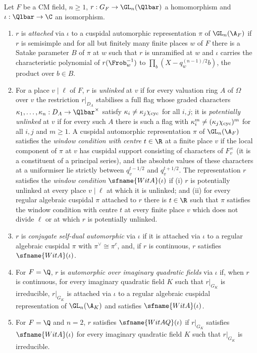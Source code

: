 \begin{definition}[Automorphy]\label{pf:modularity:aut}
Let $F$ be a CM field, $n\ge1$, $r:G_F\to\GL_n(\Qlbar)$ a homomorphism and $\iota:\Qlbar\to\C$ an isomorphism.
\begin{enumerate}[label=(\alph*)]
\item $r$ is \emph{attached} via $\iota$ to a cuspidal automorphic representation $\pi$ of $\GL_n(\A_F)$ if $r$ is
semisimple and for all but finitely many finite places $w$ of $F$ there is a Satake parameter $B$ of $\pi$ at $w$ such
that $r$ is unramified at $w$ and $\iota$ carries the characteristic polynomial of $r(\Frob_w^{-1})$ to
$\prod_{b}(X-q_w^{(n-1)/2}b)$, the product over $b\in B$.
\item For a place $v\mid\ell$ of $F$, $r$ is \emph{unlinked} at $v$ if for every valuation ring $A$ of $\Omega$ over $v$
the restriction $r|_{D_A}$ stabilises a full flag whose graded characters $\kappa_1,\dots,\kappa_n:D_A\to\Qlbar^\times$
satisfy $\kappa_i\ne\kappa_j\chi_{\mathrm{cyc}}$ for all $i,j$; it is \emph{potentially unlinked} at $v$ if for every such
$A$ there is such a flag with $\kappa_i^m\ne(\kappa_j\chi_{\mathrm{cyc}})^m$ for all $i,j$ and $m\ge1$. A cuspidal
automorphic representation $\pi$ of $\GL_n(\A_F)$ satisfies the \emph{window condition with centre $t\in\R$} at a finite
place $v$ if the local component of $\pi$ at $v$ has cuspidal support consisting of characters of $F_v^\times$ (it is a
constituent of a principal series), and the absolute values of these characters at a uniformiser lie strictly between
$q_v^{t-1/2}$ and $q_v^{t+1/2}$. The representation $r$ satisfies the \emph{window condition} $\sfname{WitA}(\iota)$ if
(i) $r$ is potentially unlinked at every place $v\mid\ell$ at which it is unlinked; and (ii) for every regular algebraic
cuspidal $\pi$ attached to $r$ there is $t\in\R$ such that $\pi$ satisfies the window condition with centre $t$ at every
finite place $v$ which does not divide $\ell$ or at which $r$ is potentially unlinked.
\item $r$ is \emph{conjugate self-dual automorphic} via $\iota$ if it is attached via $\iota$ to a regular algebraic
cuspidal $\pi$ with $\pi^\vee\cong\pi^c$, and, if $r$ is continuous, $r$ satisfies $\sfname{WitA}(\iota)$.
\item For $F=\Q$, $r$ is \emph{automorphic over imaginary quadratic fields} via $\iota$ if, when $r$ is continuous,
for every imaginary quadratic field $K$ such that $r|_{G_K}$ is irreducible, $r|_{G_K}$ is attached via $\iota$ to a
regular algebraic cuspidal representation of $\GL_n(\A_K)$ and satisfies $\sfname{WitA}(\iota)$.
\item For $F=\Q$ and $n=2$, $r$ satisfies $\sfname{WitAQ}(\iota)$ if $r|_{G_K}$ satisfies $\sfname{WitA}(\iota)$ for
every imaginary quadratic field $K$ such that $r|_{G_K}$ is irreducible.
\end{enumerate}
\end{definition}

